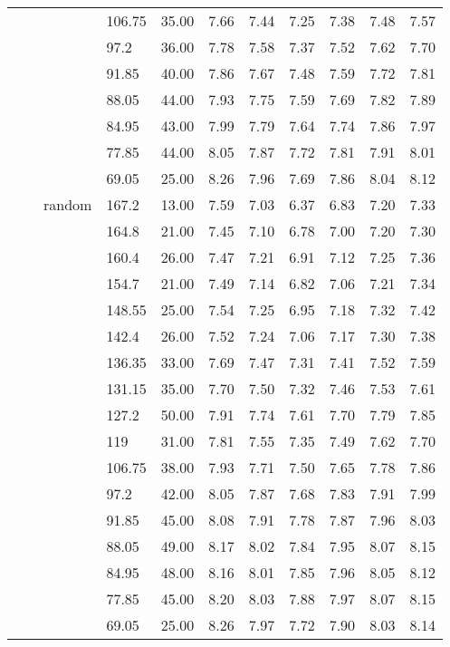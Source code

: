 \begin{longtable}{llllrrrrrrr}
   &  &  & 106.75 & 35.00 & 7.66 & 7.44 & 7.25 & 7.38 & 7.48 & 7.57 \\ 
   &  &  & 97.2 & 36.00 & 7.78 & 7.58 & 7.37 & 7.52 & 7.62 & 7.70 \\ 
   &  &  & 91.85 & 40.00 & 7.86 & 7.67 & 7.48 & 7.59 & 7.72 & 7.81 \\ 
   &  &  & 88.05 & 44.00 & 7.93 & 7.75 & 7.59 & 7.69 & 7.82 & 7.89 \\ 
   &  &  & 84.95 & 43.00 & 7.99 & 7.79 & 7.64 & 7.74 & 7.86 & 7.97 \\ 
   &  &  & 77.85 & 44.00 & 8.05 & 7.87 & 7.72 & 7.81 & 7.91 & 8.01 \\ 
   &  &  & 69.05 & 25.00 & 8.26 & 7.96 & 7.69 & 7.86 & 8.04 & 8.12 \\ 
   &  & random & 167.2 & 13.00 & 7.59 & 7.03 & 6.37 & 6.83 & 7.20 & 7.33 \\ 
   &  &  & 164.8 & 21.00 & 7.45 & 7.10 & 6.78 & 7.00 & 7.20 & 7.30 \\ 
   &  &  & 160.4 & 26.00 & 7.47 & 7.21 & 6.91 & 7.12 & 7.25 & 7.36 \\ 
   &  &  & 154.7 & 21.00 & 7.49 & 7.14 & 6.82 & 7.06 & 7.21 & 7.34 \\ 
   &  &  & 148.55 & 25.00 & 7.54 & 7.25 & 6.95 & 7.18 & 7.32 & 7.42 \\ 
   &  &  & 142.4 & 26.00 & 7.52 & 7.24 & 7.06 & 7.17 & 7.30 & 7.38 \\ 
   &  &  & 136.35 & 33.00 & 7.69 & 7.47 & 7.31 & 7.41 & 7.52 & 7.59 \\ 
   &  &  & 131.15 & 35.00 & 7.70 & 7.50 & 7.32 & 7.46 & 7.53 & 7.61 \\ 
   &  &  & 127.2 & 50.00 & 7.91 & 7.74 & 7.61 & 7.70 & 7.79 & 7.85 \\ 
   &  &  & 119 & 31.00 & 7.81 & 7.55 & 7.35 & 7.49 & 7.62 & 7.70 \\ 
   &  &  & 106.75 & 38.00 & 7.93 & 7.71 & 7.50 & 7.65 & 7.78 & 7.86 \\ 
   &  &  & 97.2 & 42.00 & 8.05 & 7.87 & 7.68 & 7.83 & 7.91 & 7.99 \\ 
   &  &  & 91.85 & 45.00 & 8.08 & 7.91 & 7.78 & 7.87 & 7.96 & 8.03 \\ 
   &  &  & 88.05 & 49.00 & 8.17 & 8.02 & 7.84 & 7.95 & 8.07 & 8.15 \\ 
   &  &  & 84.95 & 48.00 & 8.16 & 8.01 & 7.85 & 7.96 & 8.05 & 8.12 \\ 
   &  &  & 77.85 & 45.00 & 8.20 & 8.03 & 7.88 & 7.97 & 8.07 & 8.15 \\ 
   &  &  & 69.05 & 25.00 & 8.26 & 7.97 & 7.72 & 7.90 & 8.03 & 8.14 \\ 

\end{longtable}
